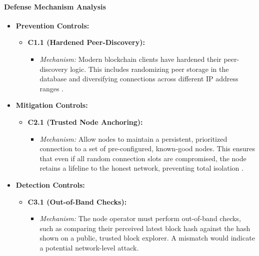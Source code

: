 \paragraph{Defense Mechanism Analysis}

\begin{itemize}
    \item \textbf{Prevention Controls:}
    \begin{itemize}
        \item \textbf{C1.1 (Hardened Peer-Discovery):}
            \begin{itemize}
                \item \textit{Mechanism:} Modern blockchain clients have hardened their peer-discovery logic. This includes randomizing peer storage in the database and diversifying connections across different IP address ranges \cite{Wang2019}.
            \end{itemize}
    \end{itemize}
    \item \textbf{Mitigation Controls:}
    \begin{itemize}
        \item \textbf{C2.1 (Trusted Node Anchoring):}
            \begin{itemize}
                \item \textit{Mechanism:} Allow nodes to maintain a persistent, prioritized connection to a set of pre-configured, known-good nodes. This ensures that even if all random connection slots are compromised, the node retains a lifeline to the honest network, preventing total isolation \cite{Wang2019}.
            \end{itemize}
    \end{itemize}
    \item \textbf{Detection Controls:}
    \begin{itemize}
        \item \textbf{C3.1 (Out-of-Band Checks):}
            \begin{itemize}
                \item \textit{Mechanism:} The node operator must perform out-of-band checks, such as comparing their perceived latest block hash against the hash shown on a public, trusted block explorer. A mismatch would indicate a potential network-level attack\cite{Apostolaki2017hijacking}.
            \end{itemize}
    \end{itemize}
\end{itemize}

